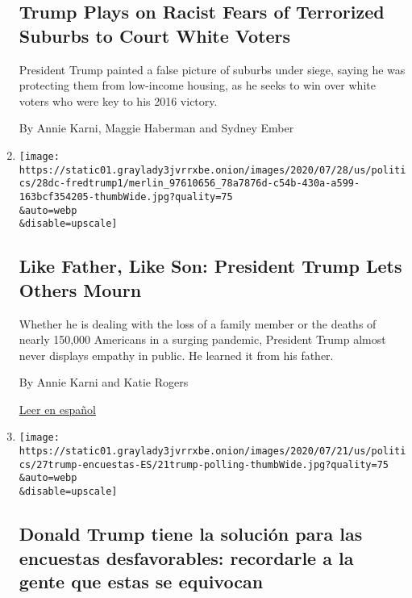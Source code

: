 \begin{enumerate}
  \hypertarget{trump-plays-on-racist-fears-of-terrorized-suburbs-to-court-white-voters}{%
  \subsection{Trump Plays on Racist Fears of Terrorized Suburbs to Court
  White
  Voters}\label{trump-plays-on-racist-fears-of-terrorized-suburbs-to-court-white-voters}}

  President Trump painted a false picture of suburbs under siege, saying
  he was protecting them from low-income housing, as he seeks to win
  over white voters who were key to his 2016 victory.

  By Annie Karni, Maggie Haberman and Sydney Ember
\item
  \href{/2020/07/28/us/politics/donald-fred-trump.html}{}

  \texttt{[image: https://static01.graylady3jvrrxbe.onion/images/2020/07/28/us/politics/28dc-fredtrump1/merlin\_97610656\_78a7876d-c54b-430a-a599-163bcf354205-thumbWide.jpg?quality=75\\\&auto=webp\\\&disable=upscale]}

  \hypertarget{like-father-like-son-president-trump-lets-others-mourn}{%
  \subsection{Like Father, Like Son: President Trump Lets Others
  Mourn}\label{like-father-like-son-president-trump-lets-others-mourn}}

  Whether he is dealing with the loss of a family member or the deaths
  of nearly 150,000 Americans in a surging pandemic, President Trump
  almost never displays empathy in public. He learned it from his
  father.

  By Annie Karni and Katie Rogers

  \href{https://www.nytimes3xbfgragh.onion/es/2020/07/31/espanol/estados-unidos/fred-trump-donald-trump.html}{Leer
  en español}
\item
  \href{/es/2020/07/27/espanol/estados-unidos/Trump-encuestas-elecciones.html}{}

  \texttt{[image: https://static01.graylady3jvrrxbe.onion/images/2020/07/21/us/politics/27trump-encuestas-ES/21trump-polling-thumbWide.jpg?quality=75\\\&auto=webp\\\&disable=upscale]}

  \hypertarget{donald-trump-tiene-la-soluciuxf3n-para-las-encuestas-desfavorables-recordarle-a-la--gente-que-estas-se-equivocan}{%
  \subsection{Donald Trump tiene la solución para las encuestas
  desfavorables: recordarle a la~ gente que estas se
  equivocan}\label{donald-trump-tiene-la-soluciuxf3n-para-las-encuestas-desfavorables-recordarle-a-la--gente-que-estas-se-equivocan}}


\end{enumerate}

